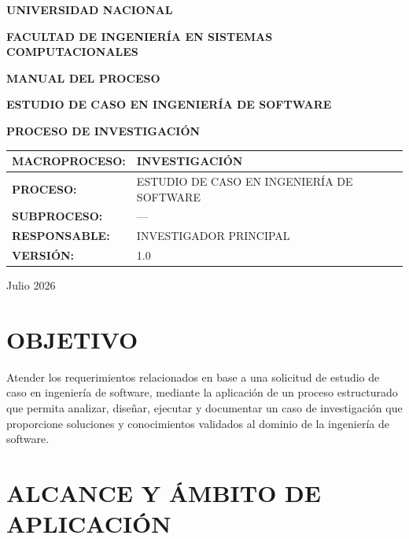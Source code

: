 \documentclass[12pt,a4paper]{article}
\begin{document}
\begin{titlepage}
\centering
\vspace*{2cm}

{\Large\textbf{UNIVERSIDAD NACIONAL}}

\vspace{0.5cm}
{\Large\textbf{FACULTAD DE INGENIERÍA EN SISTEMAS COMPUTACIONALES}}

\vspace{3cm}

{\LARGE\textbf{MANUAL DEL PROCESO}}

\vspace{0.5cm}
{\LARGE\textbf{ESTUDIO DE CASO EN INGENIERÍA DE SOFTWARE}}

\vspace{2cm}

{\large\textbf{PROCESO DE INVESTIGACIÓN}}

\vspace{1cm}

\begin{tabular}{|l|l|}
\hline
\textbf{MACROPROCESO:} & INVESTIGACIÓN \\
\hline
\textbf{PROCESO:} & ESTUDIO DE CASO EN INGENIERÍA DE SOFTWARE \\
\hline
\textbf{SUBPROCESO:} & --- \\
\hline
\textbf{RESPONSABLE:} & INVESTIGADOR PRINCIPAL \\
\hline
\textbf{VERSIÓN:} & 1.0 \\
\hline
\end{tabular}

\vspace{3cm}

{\large Julio 2026}

\end{titlepage}

\tableofcontents
\newpage

\section{OBJETIVO}

Atender los requerimientos relacionados en base a una solicitud de estudio de caso en ingeniería de software, mediante la aplicación de un proceso estructurado que permita analizar, diseñar, ejecutar y documentar un caso de investigación que proporcione soluciones y conocimientos validados al dominio de la ingeniería de software.

\section{ALCANCE Y ÁMBITO DE APLICACIÓN}
\end{document}
